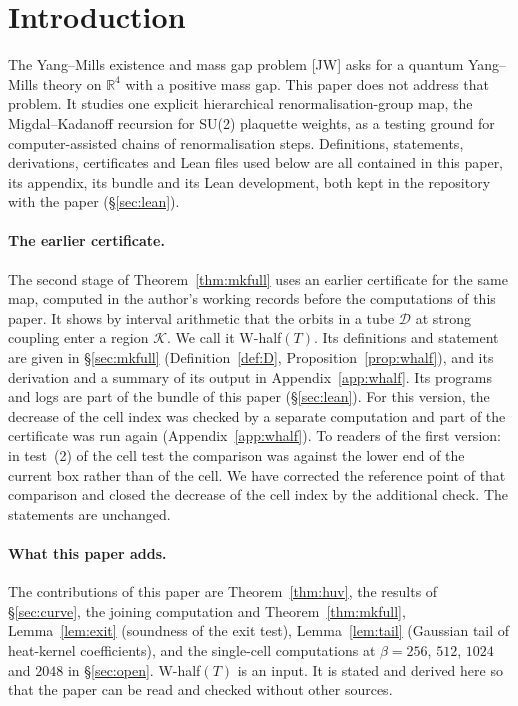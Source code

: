 \documentclass[11pt,a4paper]{article}
\theoremstyle{definition}
\theoremstyle{remark}
\newcommand{\cD}{\mathcal{D}}
\newcommand{\cK}{\mathcal{K}}
\begin{document}
\section*{Introduction}\label{sec:intro}
The Yang--Mills existence and mass gap problem [JW] asks for a quantum Yang--Mills theory on $\mathbb{R}^4$ with a positive mass gap.
This paper does not address that problem.
It studies one explicit hierarchical renormalisation-group map, the Migdal--Kadanoff recursion for SU(2) plaquette weights, as a testing ground for computer-assisted chains of renormalisation steps.
Definitions, statements, derivations, certificates and Lean files used below are all contained in this paper, its appendix, its bundle and its Lean development, both kept in the repository with the paper (\S\ref{sec:lean}).

\paragraph{The earlier certificate.}
The second stage of Theorem~\ref{thm:mkfull} uses an earlier certificate for the same map, computed in the author's working records before the computations of this paper.
It shows by interval arithmetic that the orbits in a tube $\cD$ at strong coupling enter a region $\cK$.
We call it W-half$(T)$.
Its definitions and statement are given in \S\ref{sec:mkfull} (Definition~\ref{def:D}, Proposition~\ref{prop:whalf}), and its derivation and a summary of its output in Appendix~\ref{app:whalf}.
Its programs and logs are part of the bundle of this paper (\S\ref{sec:lean}).
For this version, the decrease of the cell index was checked by a separate computation and part of the certificate was run again (Appendix~\ref{app:whalf}).
To readers of the first version: in test~(2) of the cell test the comparison was against the lower end of the current box rather than of the cell.
We have corrected the reference point of that comparison and closed the decrease of the cell index by the additional check.
The statements are unchanged.

\paragraph{What this paper adds.}
The contributions of this paper are Theorem~\ref{thm:huv}, the results of \S\ref{sec:curve}, the joining computation and Theorem~\ref{thm:mkfull}, Lemma~\ref{lem:exit} (soundness of the exit test), Lemma~\ref{lem:tail} (Gaussian tail of heat-kernel coefficients), and the single-cell computations at $\beta=256$, $512$, $1024$ and $2048$ in \S\ref{sec:open}.
W-half$(T)$ is an input.
It is stated and derived here so that the paper can be read and checked without other sources.
\end{document}
